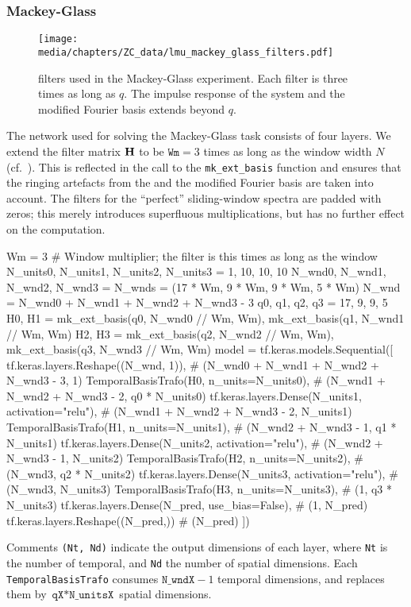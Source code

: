 \subsubsection{Mackey-Glass}

\begin{figure}
	\texttt{[image: media/chapters/ZC\_data/lmu\_mackey\_glass\_filters.pdf]}
	\caption[FIR filters used in the Mackey-Glass experiment]{\FIR filters used in the Mackey-Glass experiment. Each filter is three times as long as $q$. The impulse response of the \LDN system and the modified Fourier basis extends beyond $q$.}
	\label{fig:lmu_mackey_glass_filters}
\end{figure}

The network used for solving the Mackey-Glass task consists of four \LMU layers.
We extend the filter matrix $\mathbf{H}$ to be $\texttt{Wm} = 3$ times as long as the window width $N$ (cf.~).
This is reflected in the call to the \texttt{mk\_ext\_basis} function and ensures that the ringing artefacts from the \LDN and the modified Fourier basis are taken into account.
The \FIR filters for the \enquote{perfect} sliding-window spectra are padded with zeros; this merely introduces superfluous multiplications, but has no further effect on the computation.
\begin{pythoncode}
Wm = 3 # Window multiplier; the \FIR filter is this times as long as the window
N_units0, N_units1, N_units2, N_units3 = 1, 10, 10, 10
N_wnd0, N_wnd1, N_wnd2, N_wnd3 = N_wnds = (17 * Wm, 9 * Wm, 9 * Wm, 5 * Wm)
N_wnd = N_wnd0 + N_wnd1 + N_wnd2 + N_wnd3 - 3
q0, q1, q2, q3 = 17, 9, 9, 5
H0, H1 = mk_ext_basis(q0, N_wnd0 // Wm, Wm), mk_ext_basis(q1, N_wnd1 // Wm, Wm)
H2, H3 = mk_ext_basis(q2, N_wnd2 // Wm, Wm), mk_ext_basis(q3, N_wnd3 // Wm, Wm)
model = tf.keras.models.Sequential([
  tf.keras.layers.Reshape((N_wnd, 1)),
  # (N_wnd0 + N_wnd1 + N_wnd2 + N_wnd3 - 3, 1)
  TemporalBasisTrafo(H0, n_units=N_units0),
  # (N_wnd1 + N_wnd2 + N_wnd3 - 2, q0 * N_units0)
  tf.keras.layers.Dense(N_units1, activation="relu"),
  # (N_wnd1 + N_wnd2 + N_wnd3 - 2, N_units1)
  TemporalBasisTrafo(H1, n_units=N_units1),
  # (N_wnd2 + N_wnd3 - 1, q1 * N_units1)
  tf.keras.layers.Dense(N_units2, activation="relu"),
  # (N_wnd2 + N_wnd3 - 1, N_units2)
  TemporalBasisTrafo(H2, n_units=N_units2),
  # (N_wnd3, q2 * N_units2)
  tf.keras.layers.Dense(N_units3, activation="relu"),
  # (N_wnd3, N_units3)
  TemporalBasisTrafo(H3, n_units=N_units3),
  # (1, q3 * N_units3)
  tf.keras.layers.Dense(N_pred, use_bias=False), # (1, N_pred)
  tf.keras.layers.Reshape((N_pred,)) # (N_pred)
])
\end{pythoncode}
Comments \texttt{(Nt, Nd)} indicate the output dimensions of each layer, where \texttt{Nt} is the number of temporal, and \texttt{Nd} the number of spatial dimensions.
Each \texttt{TemporalBasisTrafo} consumes $\texttt{N\_wndX} - 1$ temporal dimensions, and replaces them by $\texttt{qX} * \texttt{N\_unitsX}$ spatial dimensions.

